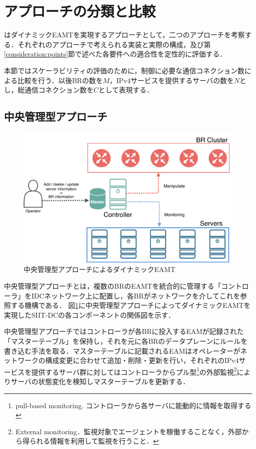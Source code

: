 \section{アプローチの分類と比較}
\label{consideration:approach}
はダイナミックEAMTを実現するアプローチとして，二つのアプローチを考察する．それぞれのアプローチで考えられる実装と実際の構成，及び第\ref{consideration:points}節で述べた各要件への適合性を定性的に評価する．

本節ではスケーラビリティの評価のために，制御に必要な通信コネクション数による比較を行う．以後BRの数を$M$，IPv4サービスを提供するサーバの数を$N$とし，総通信コネクション数を$C$として表現する．



\subsection{中央管理型アプローチ}
\label{consideration:approach:centerized}

\begin{figure}[h]
    \begin{center}
      \includegraphics[width=12cm,pagebox=cropbox,clip]{img/approach_centerized_model.pdf}
    \end{center}
    \caption{中央管理型アプローチによるダイナミックEAMT}
    \label{fig:approach_centerized_model}
\end{figure}

中央管理型アプローチとは，複数のBRのEAMTを統合的に管理する「コントローラ」をIDCネットワーク上に配置し，各BRがネットワークを介してこれを参照する機構である．
図\ref{fig:approach_centerized_model}に中央管理型アプローチによってダイナミックEAMTを実現したSIIT-DCの各コンポーネントの関係図を示す．

中央管理型アプローチではコントローラが各BRに投入するEAMが記録された「マスターテーブル」を保持し，それを元に各BRのデータプレーンにルールを書き込む手法を取る．マスターテーブルに記載されるEAMはオペレーターがネットワークの構成変更に合わせて追加・削除・更新を行い，それぞれのIPv4サービスを提供するサーバ群に対してはコントローラからプル型\footnote{pull-based monitoring. コントローラから各サーバに能動的に情報を取得する}の外部監視\footnote{External monitoring．監視対象でエージェントを稼働することなく，外部から得られる情報を利用して監視を行うこと．}によりサーバの状態変化を検知しマスターテーブルを更新する．


